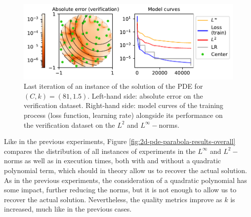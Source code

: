 \documentclass[12pt]{report} %
\begin{document}
\begin{figure}[h]
  \includegraphics[width=\textwidth]{imagenes/experiments/2d/pde_parabola/parabola-TR15-C81-19-E47449.pdf}
  \caption{Last iteration of an instance of the solution of the PDE for $(C,k)=(81,1.5)$. Left-hand side: absolute error on the verification dataset. Right-hand side: model curves of the training process (loss function, learning rate) alongside its performance on the verification dataset on the $L^2$ and $L^\infty-$norms.}
  \label{fig:2d-pde-usual-result}
\end{figure}

Like in the previous experiments, Figure \ref{fig:2d-pde-parabola-results-overall} compares the distribution of all instances of experiments in the $L^\infty$ and $L^2-$norms as well as in execution times, both with and without a quadratic polynomial term, which should in theory allow us to recover the actual solution. As in the previous experiments, the consideration of a quadratic polynomial has some impact, further reducing the norms, but it is not enough to allow us to recover the actual solution. Nevertheless, the quality metrics improve as $k$ is increased, much like in the previous cases.
\end{document}
